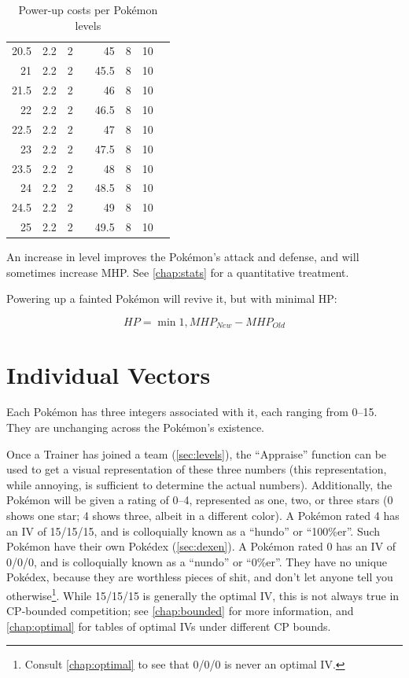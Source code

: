 \begin{table}
\begin{center}
\begin{tabular}[ht]{rrrr|rrrr}
     20.5 & 2.2 & 2 & & 45 & 8 & 10 & \\
       21 & 2.2 & 2 & & 45.5 & 8 & 10 & \\
     21.5 & 2.2 & 2 & & 46 & 8 & 10 & \\
       22 & 2.2 & 2 & & 46.5 & 8 & 10 & \\
     22.5 & 2.2 & 2 & & 47 & 8 & 10 & \\
       23 & 2.2 & 2 & & 47.5 & 8 & 10 & \\
     23.5 & 2.2 & 2 & & 48 & 8 & 10 & \\
       24 & 2.2 & 2 & & 48.5 & 8 & 10 & \\
     24.5 & 2.2 & 2 & & 49 & 8 & 10 & \\
       25 & 2.2 & 2 & & 49.5 & 8 & 10 & \\
    \end{tabular}
  \end{center}
  \caption{Power-up costs per Pokémon levels}
  \label{table:powerups}
\end{table}
An increase in level improves the Pokémon's attack and defense, and
  will sometimes increase MHP.
See \autoref{chap:stats} for a quantitative treatment.

Powering up a fainted Pokémon will revive it, but with minimal HP\@:

\[ HP = \min{1, MHP_{New} - MHP_{Old} } \]

\section{Individual Vectors}
\label{sec:ivs}
Each Pokémon has three integers associated with it, each ranging from 0--15.
They are unchanging across the Pokémon's existence.

Once a Trainer has joined a team (\autoref{sec:levels}), the ``Appraise'' function can be used to
  get a visual representation of these three numbers (this representation,
  while annoying, is sufficient to determine the actual numbers).
Additionally, the Pokémon will be given a rating of 0--4, represented as
  one, two, or three stars (0 shows one star; 4 shows three, albeit in a different color).
A Pokémon rated 4 has an IV of 15/15/15, and is colloquially known as a ``hundo'' or ``100\%er''.
Such Pokémon have their own Pokédex (\autoref{sec:dexen}).
A Pokémon rated 0 has an IV of 0/0/0, and is colloquially known as a ``nundo'' or ``0\%er''.
They have no unique Pokédex, because they are worthless pieces of shit,
  and don't let anyone tell you otherwise\footnote{Consult \autoref{chap:optimal}
  to see that 0/0/0 is never an optimal IV.}.
While 15/15/15 is generally the optimal IV, this is not always true in CP-bounded
  competition; see \autoref{chap:bounded} for more information,
  and \autoref{chap:optimal} for tables of optimal IVs under different CP bounds.

